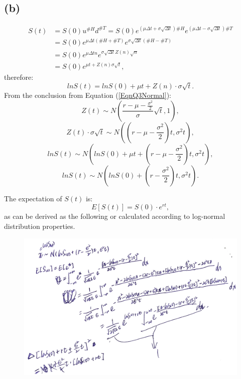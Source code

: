 \documentclass[final,3p,times]{elsarticle}
\begin{document}
	\subsection{(b)}
		\begin{equation}
			\begin{split}
				S(t)&=S(0) u^{\#H} d^{\#T}=S(0) e^{\left(\mu \Delta t + \sigma \sqrt{\Delta t}\right)\#H} e^{\left(\mu \Delta t - \sigma \sqrt{\Delta t}\right)\#T} \\
				&=S(0) e^{\mu \Delta t \left(\#H+\#T\right) } e^{\sigma \sqrt{\Delta t} \left(\#H-\#T\right) } \\
				&=S(0) e^{\mu \Delta t n } e^{\sigma \sqrt{\Delta t} Z(n) \sqrt{n} } \\
				&=S(0) e^{\mu t + Z(n) \sigma \sqrt{t}}
				,
			\end{split}
		\end{equation}
		therefore:
		\begin{equation}
			ln S(t) = ln S(0) + \mu t + Z(n) \cdot \sigma \sqrt{t}
			.
		\end{equation}
		From the conclusion from Equation (\ref{EqnQ3Normal}):
		\begin{equation*}
			Z(t) \sim N\left(\frac{r-\mu-\frac{\sigma^2}{2}}{\sigma} \sqrt{t},1\right)
			,
		\end{equation*}
		\begin{equation*}
			Z(t) \cdot \sigma \sqrt{t} \sim N\left(\left(r-\mu-\frac{\sigma^2}{2}\right) t,\sigma^2 t\right)
			,
		\end{equation*}
		\begin{equation*}
			ln S(t) \sim N\left(ln S(0)+\mu t+\left(r-\mu-\frac{\sigma^2}{2}\right) t,\sigma^2 t\right)
			,
		\end{equation*}
		\begin{equation}
			ln S(t) \sim N\left(ln S(0)+\left(r-\frac{\sigma^2}{2}\right) t,\sigma^2 t\right)
			.
		\end{equation}
		
		The expectation of $S(t)$ is:
		\begin{equation}
			E[S(t)]=S(0)\cdot e^{rt}
			,
		\end{equation}
		as can be derived as the following or calculated according to log-normal distribution properties.
		
		\begin{figure}[H]
			\centering
			\includegraphics*[width=12cm]{MyDerivationOfLogNormalExpectation.png}
		\end{figure}
		
\end{document}
